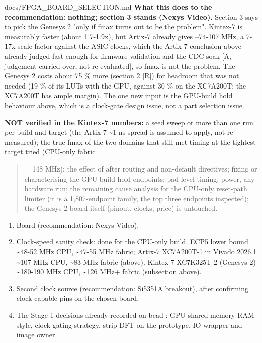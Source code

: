 \begin{relocated}{docs/FPGA_BOARD_SELECTION.md}
\textbf{What this does to the recommendation:} \textbf{nothing; section
3 stands (Nexys Video).} Section 3 says to pick the Genesys 2 "only if
fmax turns out to be the problem". Kintex-7 is measurably faster (about
1.7-1.9x), but Artix-7 already gives \textasciitilde74-107 MHz, a 7-17x
scale factor against the ASIC clocks, which the Artix-7 conclusion above
already judged fast enough for firmware validation and the CDC soak
{[}A, judgement carried over, not re-evaluated{]}, so fmax is not the
problem. The Genesys 2 costs about 75 \% more (section 2 {[}R{]}) for
headroom that was not needed (19 \% of its LUTs with the GPU, against 30
\% on the XC7A200T; the XC7A200T has ample margin). The one new input is
the GPU-build hold behaviour above, which is a clock-gate design issue,
not a part selection issue.

\textbf{NOT verified in the Kintex-7 numbers:} a seed sweep or more than
one run per build and target (the Artix-7 \textasciitilde1 ns spread is
assumed to apply, not re-measured); the true fmax of the two domains
that still met timing at the tightest target tried (CPU-only fabric

\begin{quote}
= 148 MHz); the effect of  after routing and
non-default directives; fixing or characterising the GPU-build hold
endpoints; pad-level timing, power, any hardware run; the remaining
cause analysis for the CPU-only  reset-path limiter (it
is a 1,807-endpoint family, the top three endpoints inspected); the
Genesys 2 board itself (pinout, clocks, price) is untouched.
\end{quote}

\begin{enumerate}
\def\labelenumi{\arabic{enumi}.}
\tightlist
\item
  Board (recommendation: Nexys Video).
\item
  Clock-speed sanity check: done for the CPU-only build. ECP5 lower
  bound \textasciitilde48-52 MHz CPU, \textasciitilde47-55 MHz fabric;
  Artix-7 XC7A200T-1 in Vivado 2026.1 \textasciitilde107 MHz CPU,
  \textasciitilde83 MHz fabric (above). Kintex-7 XC7K325T-2 (Genesys 2)
  \textasciitilde180-190 MHz CPU, \textasciitilde126 MHz+ fabric
  (subsection above).
\item
  Second clock source (recommendation: Si5351A breakout), after
  confirming clock-capable pins on the chosen board.
\item
  The Stage 1 decisions already recorded on bead : GPU
  shared-memory RAM style, clock-gating strategy, strip DFT on the
  prototype, IO wrapper and  image owner.
\end{enumerate}


\end{relocated}
